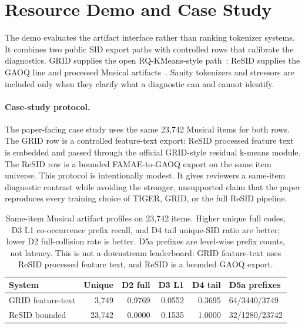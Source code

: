 \section{Resource Demo and Case Study}

The demo evaluates the artifact interface rather than ranking tokenizer
systems. It combines two public SID export paths with controlled rows that
calibrate the diagnostics. GRID supplies the open RQ-KMeans-style
path~\cite{ju2025grid}; ReSID supplies the GAOQ line and processed Musical
artifacts~\cite{liang2026resid}. Sanity tokenizers and stressors are included
only when they clarify what a diagnostic can and cannot identify.

\paragraph{Case-study protocol.}
The paper-facing case study uses the same 23,742 Musical items for both rows.
The GRID row is a controlled feature-text export: ReSID processed feature text
is embedded and passed through the official GRID-style residual k-means module.
The ReSID row is a bounded FAMAE-to-GAOQ export on the same item universe. This
protocol is intentionally modest. It gives reviewers a same-item diagnostic
contrast while avoiding the stronger, unsupported claim that the paper
reproduces every training choice of TIGER, GRID, or the full ReSID pipeline.

\begin{table}[H]
\caption{Same-item Musical artifact profiles on 23,742 items. Higher unique
full codes, D3 L1 co-occurrence prefix recall, and D4 tail unique-SID ratio are
better; lower D2 full-collision rate is better. D5a prefixes are level-wise
prefix counts, not latency. This is not a downstream leaderboard: GRID
feature-text uses ReSID processed feature text, and ReSID is a bounded GAOQ
export.}
\label{tab:musical-diagnostic}
\small
\setlength{\tabcolsep}{2.0pt}
\begin{tabular}{@{}lrrrrl@{}}
\toprule
System & Unique & D2 full & D3 L1 & D4 tail & D5a prefixes \\
\midrule
GRID feature-text & 3,749 & 0.9769 & 0.0552 & 0.3695 & 64/3440/3749 \\
ReSID bounded & 23,742 & 0.0000 & 0.1535 & 1.0000 & 32/1280/23742 \\
\bottomrule
\end{tabular}
\end{table}

